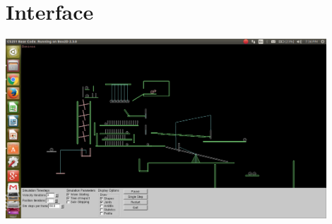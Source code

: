 \documentclass[]{report}
\begin{document}
\chapter{Interface}
\begin{center}
\includegraphics[width=12cm]{img/FirstContact}
\end{center}
\end{document}
